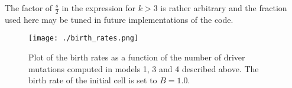 \documentclass[12pt]{article}
\begin{document}
\noindent The factor of $\frac{s}{2}$ in the expression for $k > 3$ is rather arbitrary and the fraction used here may be tuned in future implementations of the code.
 
\begin{figure}[h!]\centering
  \texttt{[image: ./birth\_rates.png]}
  \caption{\small{Plot of the birth rates as a function of the number of driver mutations computed in models 1, 3 and 4 described above. The birth rate of the initial cell is set to $B=1.0$.}}
  \label{fig:boat1}
\end{figure}
\end{document}
